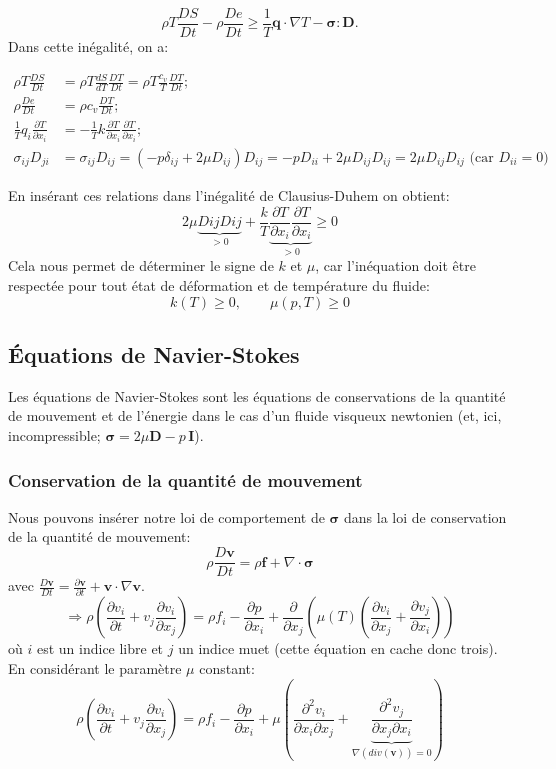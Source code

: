 $$\rho T\frac{DS}{Dt}-\rho\frac{De}{Dt}\geq\frac{1}{T}\textbf{q}\cdot\nabla T-\boldsymbol{\sigma}:\textbf{D}.$$ Dans cette inégalité, on a:

\begin{align*}
\rho T\frac{DS}{Dt}&=\rho T\frac{dS}{dT}\frac{DT}{Dt}=\rho T\frac{c_v}{T}\frac{DT}{Dt};\\
\rho\frac{De}{Dt}&=\rho c_v\frac{DT}{Dt};\\
\frac{1}{T}q_i\frac{\partial T}{\partial x_i}&=-\frac{1}{T}k\frac{\partial T}{\partial x_i}\frac{\partial T}{\partial x_i};\\
\sigma_{ij}D_{ji}&=\sigma_{ij}D_{ij}=(-p\delta_{ij}+2\mu D_{ij})D_{ij}=-pD_{ii}+2\mu D_{ij}D_{ij}= 2\mu D_{ij}D_{ij} \text{ (car $D_{ii}=0$)}
\end{align*}

En insérant ces relations dans l'inégalité de Clausius-Duhem on obtient:
$$2\mu\underbrace{DijDij}_{>0}+\frac{k}{T}\underbrace{\frac{\partial T}{\partial x_i}\frac{\partial T}{\partial x_i}}_{>0}\geq 0$$
Cela nous permet de déterminer le signe de $k$ et $\mu$, car l'inéquation doit être respectée pour tout état de déformation et de température du fluide:
$$\boxed{k(T)\geq 0, \qquad \mu(p,T)\geq 0}$$

\subsection{\'Equations de Navier-Stokes}
Les équations de Navier-Stokes sont les équations de conservations de la quantité de mouvement et de l'énergie dans le cas d'un fluide visqueux newtonien (et, ici, incompressible; $\boldsymbol{\sigma}=2\mu\textbf{D}-p\,\textbf{I}$).
\subsubsection*{Conservation de la quantité de mouvement}
Nous pouvons insérer notre loi de comportement de $\boldsymbol{\sigma}$ dans la loi de conservation de la quantité de mouvement:
$$\rho\frac{D\textbf{v}}{Dt}=\rho\textbf{f}+\nabla\cdot\boldsymbol{\sigma}$$
avec $\frac{D\textbf{v}}{Dt}=\frac{\partial\textbf{v}}{\partial t}+\textbf{v}\cdot\nabla\textbf{v}$.
$$\Rightarrow\rho\left(\frac{\partial v_i}{\partial t}+v_j\frac{\partial v_i}{\partial x_j}\right)=\rho f_i-\frac{\partial p}{\partial x_i}+\frac{\partial}{\partial x_j}\left(\mu(T)\left(\frac{\partial v_i}{\partial x_j}+\frac{\partial v_j}{\partial x_i}\right)\right) $$ où $i$ est un indice libre et $j$ un indice muet (cette équation en cache donc trois). En considérant le paramètre $\mu$ constant:
$$\rho\left(\frac{\partial v_i}{\partial t}+v_j\frac{\partial v_i}{\partial x_j}\right)=\rho f_i-\frac{\partial p}{\partial x_i}+\mu\left(\frac{\partial^2v_i}{\partial x_i\partial x_j}+\underbrace{\frac{\partial^2 v_j}{\partial x_j\partial x_i}}_{\nabla(div(\textbf{v}))=0}\right) $$

